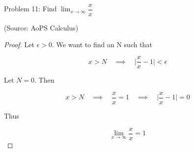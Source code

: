 \usepackage{amsthm}

Problem 11: Find $\lim_{x \rightarrow \infty} \dfrac{x}{x}$

(Source: AoPS Calculus)

\begin{proof}
Let $\epsilon > 0$. We want to find an N such that 

$$ x > N \quad \implies \quad \Bigg|\frac{x}{x} - 1\Bigg| < \epsilon $$

Let $N = 0$. Then

$$ x > N \quad \implies \quad \frac{x}{x} = 1 \quad \implies \quad \Bigg|\frac{x}{x} - 1\Bigg| = 0 $$

Thus

$$ \lim_{x \rightarrow \infty} \dfrac{x}{x} = 1 $$
\end{proof}
